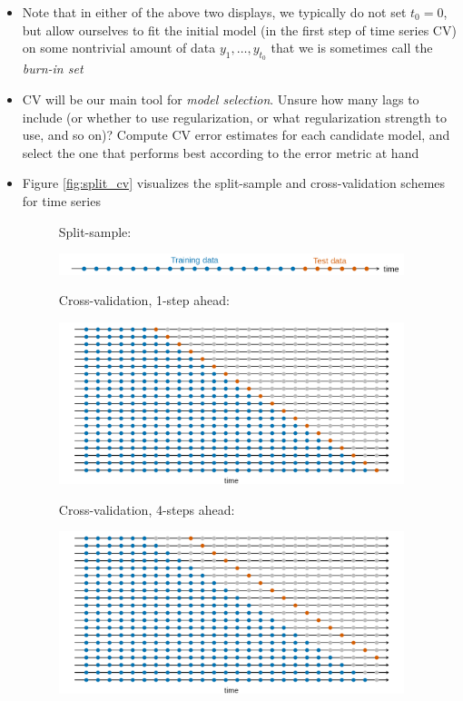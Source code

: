 \documentclass{article}
\begin{document}
\begin{itemize}
\item Note that in either of the above two displays, we typically do not set
  $t_0 = 0$, but allow ourselves to fit the initial model (in the first step of 
  time series CV) on some nontrivial amount of data $y_1, \dots, y_{t_0}$ that
  we is sometimes call the \emph{burn-in set}

\item CV will be our main tool for \emph{model selection}. Unsure how many lags 
  to include (or whether to use regularization, or what regularization strength
  to use, and so on)? Compute CV error estimates for each candidate model, and 
  select the one that performs best according to the error metric at hand

\item Figure \ref{fig:split_cv} visualizes the split-sample and cross-validation
  schemes for time series 

\begin{figure}[p]
\centering
Split-sample: 

\smallskip
\includegraphics[width=0.95\textwidth]{split.png}

\bigskip
Cross-validation, 1-step ahead:

\smallskip
\includegraphics[width=0.95\textwidth]{cv1.png}

\bigskip
Cross-validation, 4-steps ahead: 

\smallskip
\includegraphics[width=0.95\textwidth]{cv4.png}


\end{figure}
\end{itemize}
\end{document}

